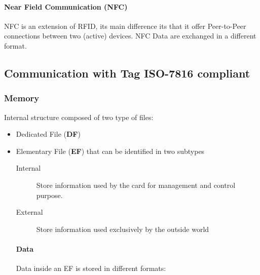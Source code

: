 
\paragraph{Near Field Communication (NFC)}
NFC is an extension of RFID, its main difference its that it offer
Peer-to-Peer connections between two (active) devices. NFC Data are exchanged
in a different format.


\subsection{Communication with Tag \textsc{ISO-7816} compliant}

\subsubsection{Memory}
    Internal structure composed of two type of files:
\begin{itemize}
    \item Dedicated File (\textbf{DF})
    \item Elementary File (\textbf{EF}) that can be identified in two subtypes
    \begin{description}
        \item[Internal] Store information used by the card for management and
        control purpose.
        \item[External] Store information used exclusively by the outside world
    \end{description}
    
    \paragraph{Data}
    Data inside an EF is stored in different formats:
\end{itemize}

